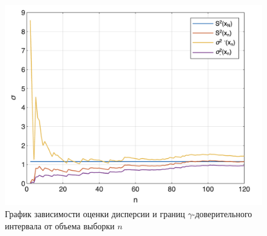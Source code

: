 \begin{figure}[h]
	\centering
	\includegraphics[scale=0.9]{images/sigma_square.png}
	\caption{График зависимости оценки дисперсии и границ $\gamma$-доверительного интервала от объема выборки $n$}
	\label{fig:emperic}
\end{figure}

